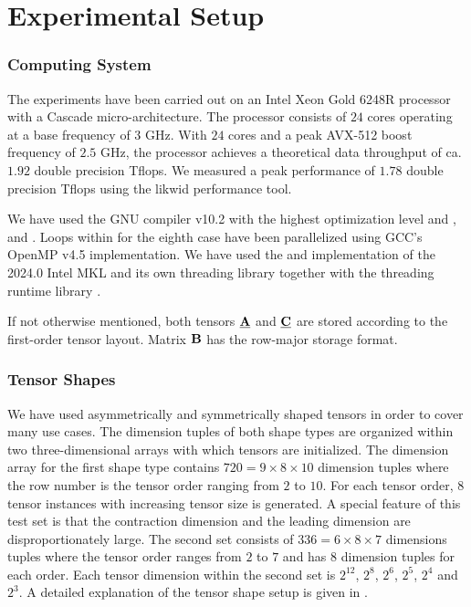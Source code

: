 \section{Experimental Setup}
\label{sec:experimental.setup}
\subsubsection{Computing System} 
The experiments have been carried out on an Intel Xeon Gold 6248R processor with a Cascade micro-architecture. The processor consists of $24$ cores operating at a base frequency of $3$ GHz.
With $24$ cores and a peak AVX-512 boost frequency of $2.5$ GHz, the processor achieves a theoretical data throughput of ca. $1.92$ double precision Tflops.
We measured a peak performance of $1.78$ double precision Tflops using the likwid performance tool.

We have used the GNU compiler v10.2 with the highest optimization level  and ,  and . 
Loops within for the eighth case have been parallelized using GCC's OpenMP v4.5 implementation.
We have used the  and  implementation of the 2024.0 Intel MKL and its own threading library  together with the threading runtime library .

If not otherwise mentioned, both tensors $\underline{\mathbf{A}}$ and $\underline{\mathbf{C}}$ are stored according to the first-order tensor layout.
Matrix $\mathbf{B}$ has the row-major storage format.

\subsubsection{Tensor Shapes} 
We have used asymmetrically and symmetrically shaped tensors in order to cover many use cases. 
The dimension tuples of both shape types are organized within two three-dimensional arrays with which tensors are initialized.
The dimension array for the first shape type contains $720 = 9\times 8 \times 10$ dimension tuples where the row number is the tensor order ranging from $2$ to $10$. 
For each tensor order, $8$ tensor instances with increasing tensor size is generated.
A special feature of this test set is that the contraction dimension and the leading dimension are disproportionately large.
The second set consists of $336 = 6\times8\times 7$ dimensions tuples where the tensor order ranges from $2$ to $7$ and has $8$ dimension tuples for each order.
Each tensor dimension within the second set is $2^{12}$, $2^{8}$, $2^{6}$, $2^5$, $2^4$ and $2^3$.
A detailed explanation of the tensor shape setup is given in \cite{bassoy:2019:ttv, bassoy:2018:fast}.